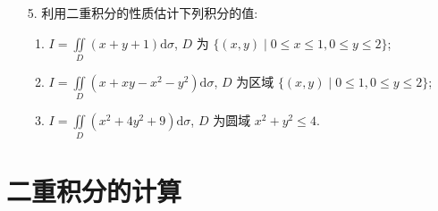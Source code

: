 \begin{enumerate}
    \item[5.] 利用二重积分的性质估计下列积分的值:
    \begin{enumerate}[(1)]\setlength{\itemsep}{5pt}\setlength{\topsep}{15pt}
        \item $\displaystyle I=\iint\limits_{D}(x+y+1)\text{d}\sigma$, $D$ 为 $\{(x, y)\mid 0\leqslant x\leqslant 1,0\leqslant y\leqslant 2\}$;
        \item $\displaystyle I=\iint\limits_{D}(x+xy-x^2-y^2)\text{d}\sigma$, $D$ 为区域 $\{(x, y) \mid 0\leqslant 1, 0\leqslant y \leqslant 2\}$;
        \item $\displaystyle I=\iint\limits_{D}(x^2+4y^2+9)\text{d}\sigma$, $D$ 为圆域 $x^2+y^2\leqslant 4$.
    \end{enumerate} 
\end{enumerate}

\section{二重积分的计算}


